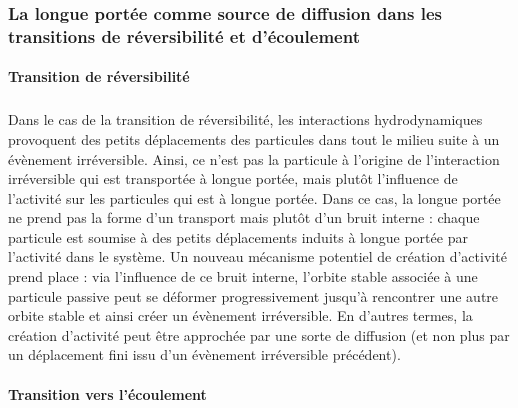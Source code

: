 \subsubsection{La longue portée comme source de diffusion dans les transitions de réversibilité et d'écoulement}

\paragraph{Transition de réversibilité}

\subparagraph{}Dans le cas de la transition de réversibilité, les interactions hydrodynamiques provoquent des petits déplacements des particules dans tout le milieu suite à un évènement irréversible. Ainsi, ce n'est pas la particule à l'origine de l'interaction irréversible qui est transportée à longue portée, mais plutôt l'influence de l'activité sur les particules qui est à longue portée. Dans ce cas, la longue portée ne prend pas la forme d'un transport mais plutôt d'un bruit interne : chaque particule est soumise à des petits déplacements induits à longue portée par l'activité dans le système. Un nouveau mécanisme potentiel de création d'activité prend place : via l'influence de ce bruit interne, l'orbite stable associée à une particule passive peut se déformer progressivement jusqu'à rencontrer une autre orbite stable et ainsi créer un évènement irréversible. En d'autres termes, la création d'activité peut être approchée par une sorte de diffusion (et non plus par un déplacement fini issu d'un évènement irréversible précédent).

\paragraph{Transition vers l'écoulement}

